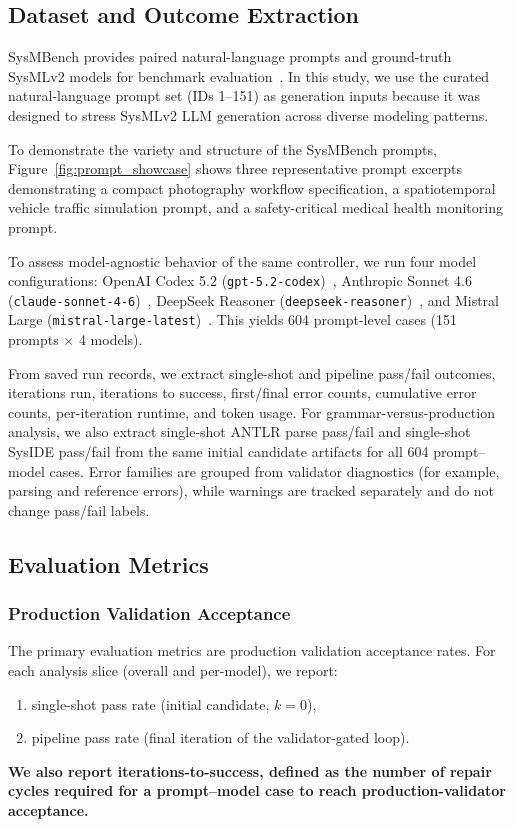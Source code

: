 \subsection{Dataset and Outcome Extraction}
SysMBench provides paired natural-language prompts and ground-truth SysMLv2 models for benchmark evaluation~\cite{jin2025sysmbench}. In this study, we use the curated natural-language prompt set (IDs 1--151) as generation inputs because it was designed to stress SysMLv2 LLM generation across diverse modeling patterns.

To demonstrate the variety and structure of the SysMBench prompts, Figure~\ref{fig:prompt_showcase} shows three representative prompt excerpts demonstrating a compact photography workflow specification, a spatiotemporal vehicle traffic simulation prompt, and a safety-critical medical health monitoring prompt.

To assess model-agnostic behavior of the same controller, we run four model configurations: OpenAI Codex 5.2 (\texttt{gpt-5.2-codex})~\cite{openaiGPT52Codex2026}, Anthropic Sonnet 4.6 (\texttt{claude-sonnet-4-6})~\cite{anthropicSonnet46API2026}, DeepSeek Reasoner (\texttt{deepseek-reasoner})~\cite{deepseekReasonerAPI2026}, and Mistral Large (\texttt{mistral-large-latest})~\cite{mistralLargeLatestDocs2026}. This yields 604 prompt-level cases (151 prompts $\times$ 4 models).

From saved run records, we extract single-shot and pipeline pass/fail outcomes, iterations run, iterations to success, first/final error counts, cumulative error counts, per-iteration runtime, and token usage. For grammar-versus-production analysis, we also extract single-shot ANTLR parse pass/fail and single-shot SysIDE pass/fail from the same initial candidate artifacts for all 604 prompt--model cases. Error families are grouped from validator diagnostics (for example, parsing and reference errors), while warnings are tracked separately and do not change pass/fail labels.

\subsection{Evaluation Metrics}
\subsubsection{Production Validation Acceptance}
The primary evaluation metrics are production validation acceptance rates. For each analysis slice (overall and per-model), we report:
\begin{enumerate}
    \item single-shot pass rate (initial candidate, $k=0$),
    \item pipeline pass rate (final iteration of the validator-gated loop).
\end{enumerate}
\textbf{We also report iterations-to-success, defined as the number of repair cycles required for a prompt–model case to reach production-validator acceptance.}


